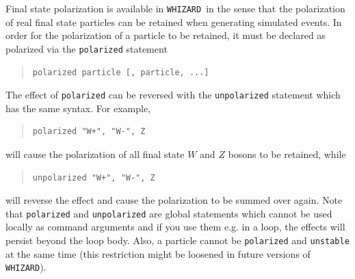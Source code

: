 \documentclass[12pt]{book}
\newcommand{\ttt}[1]{\texttt{#1}}
\newcommand{\whizard}{\ttt{WHIZARD}}
\begin{document}
Final state polarization is available in \whizard\ in the sense that the
polarization of real final state particles can be retained when generating
simulated
events. In order for the polarization of a particle to be retained, it must be
declared as polarized via the \ttt{polarized} statement
\begin{quote}
\begin{footnotesize}
\begin{verbatim}
polarized particle [, particle, ...]
\end{verbatim}
\end{footnotesize}
\end{quote}
The effect of \ttt{polarized} can be reversed with the \ttt{unpolarized}
statement which has the same syntax. For example,
\begin{quote}
\begin{footnotesize}
\begin{verbatim}
polarized "W+", "W-", Z
\end{verbatim}
\end{footnotesize}
\end{quote}
will cause the polarization of all final state $W$ and $Z$ bosons to be
retained, while
\begin{quote}
\begin{footnotesize}
\begin{verbatim}
unpolarized "W+", "W-", Z
\end{verbatim}
\end{footnotesize}
\end{quote}
will reverse the effect and cause the polarization to be summed over again. Note
that \ttt{polarized} and \ttt{unpolarized} are global statements which cannot be
used locally as command arguments and if you use them e.g. in a loop, the
effects will persist beyond the loop body. Also, a particle cannot be
\ttt{polarized} and \ttt{unstable} at the same time (this restriction
might be loosened in future versions of \whizard).
\end{document}
